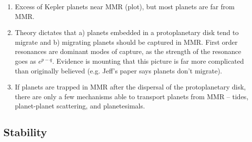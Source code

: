 \documentclass[12pt,letter]{aastex}
\begin{document}

\begin{enumerate}
\item Excess of Kepler planets near MMR (plot), but most planets are far from MMR. 
\item Theory dictates that a) planets embedded in a protoplanetary disk tend to migrate and b) migrating planets should be captured in MMR. First order resonances are dominant modes of capture, as the strength of the resonance goes as $e^{p-q}$. Evidence is mounting that this picture is far more complicated than originally believed (e.g. Jeff's paper says planets don't migrate). 
\item If planets are trapped in MMR after the dispersal of the protoplanetary disk, there are only a few mechanisms able to transport planets from MMR -- tides, planet-planet scattering, and planetesimals. 
\end{enumerate}

\subsection{Stability}



\end{document}
